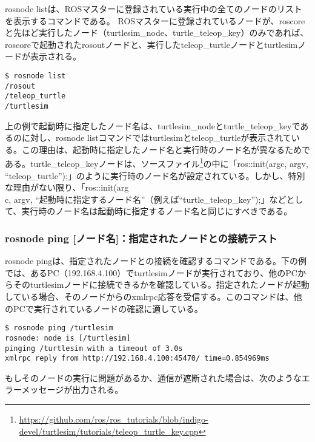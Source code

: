 rosnode listは、ROSマスターに登録されている実行中の全てのノードのリストを表示するコマンドである。 ROSマスターに登録されているノードが、roscoreと先ほど実行したノード（turtlesim\_node、turtle\_teleop\_key）のみであれば、roscoreで起動されたrosoutノードと、実行したteleop\_turtleノードとturtlesimノードが表示される。

\begin{lstlisting}[language=ROS]
$ rosnode list
/rosout
/teleop_turtle
/turtlesim
\end{lstlisting}

\begin{exercise}[起動時に指定するノード名と実行されたノード名が違う理由]
上の例で起動時に指定したノード名は、turtlesim\_nodeとturtle\_teleop\_keyであるのに対し、rosnode listコマンドではturtlesimとteleop\_turtleが表示されている。この理由は、起動時に指定したノード名と実行時のノード名が異なるためである。turtle\_teleop\_keyノードは、ソースファイル\footnote{\url{https://github.com/ros/ros\_tutorials/blob/indigo-devel/turtlesim/tutorials/teleop\_turtle\_key.cpp}}の中に「ros::init(argc, argv, ``teleop\_turtle'');」のように実行時のノード名が設定されている。しかし、特別な理由がない限り、「ros::init(arg\\c, argv, ``起動時に指定するノード名''（例えば``turtle\_teleop\_key'');」などとして、実行時のノード名は起動時に指定するノード名と同じにすべきである。
\end{exercise}

\subsubsection{rosnode ping [ノード名]：指定されたノードとの接続テスト}

rosnode pingは、指定されたノードとの接続を確認するコマンドである。下の例では、あるPC（192.168.4.100）でturtlesimノードが実行されており、他のPCからそのturtlesimノードに接続できるかを確認している。指定されたノードが起動している場合、そのノードからのxmlrpc応答を受信する。このコマンドは、他のPCで実行されているノードの確認に適している。

\begin{lstlisting}[language=ROS]
$ rosnode ping /turtlesim
rosnode: node is [/turtlesim]
pinging /turtlesim with a timeout of 3.0s
xmlrpc reply from http://192.168.4.100:45470/ time=0.854969ms
\end{lstlisting}

もしそのノードの実行に問題があるか、通信が遮断された場合は、次のようなエラーメッセージが出力される。

